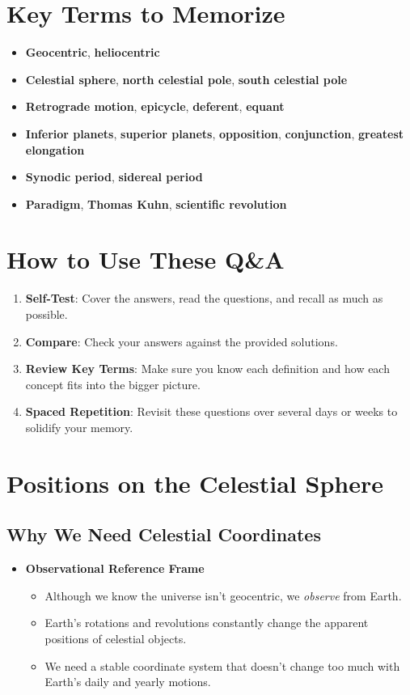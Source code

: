 \section*{Key Terms to Memorize}

\begin{itemize}
    \item \textbf{Geocentric}, \textbf{heliocentric}
    \item \textbf{Celestial sphere}, \textbf{north celestial pole}, \textbf{south celestial pole}
    \item \textbf{Retrograde motion}, \textbf{epicycle}, \textbf{deferent}, \textbf{equant}
    \item \textbf{Inferior planets}, \textbf{superior planets}, \textbf{opposition}, \textbf{conjunction}, \textbf{greatest elongation}
    \item \textbf{Synodic period}, \textbf{sidereal period}
    \item \textbf{Paradigm}, \textbf{Thomas Kuhn}, \textbf{scientific revolution}
\end{itemize}

\hrulefill

\section*{How to Use These Q\&A}
\begin{enumerate}
    \item \textbf{Self-Test}: Cover the answers, read the questions, and recall as much as possible.
    \item \textbf{Compare}: Check your answers against the provided solutions.
    \item \textbf{Review Key Terms}: Make sure you know each definition and how each concept fits into the bigger picture.
    \item \textbf{Spaced Repetition}: Revisit these questions over several days or weeks to solidify your memory.
\end{enumerate}




\section{Positions on the Celestial Sphere}

\subsection{Why We Need Celestial Coordinates}
\begin{itemize}
  \item \textbf{Observational Reference Frame}
  \begin{itemize}
    \item Although we know the universe isn’t geocentric, we \emph{observe} from Earth.
    \item Earth’s rotations and revolutions constantly change the apparent positions of celestial objects.
    \item We need a stable coordinate system that doesn’t change too much with Earth’s daily and yearly motions.
  \end{itemize}
\end{itemize}

